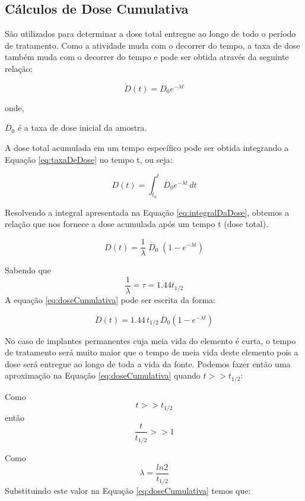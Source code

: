 \documentclass[11pt,a4paper]{article}
\begin{document}
		\subsection{Cálculos de Dose Cumulativa}

			São utilizados para determinar a dose total entregue ao longo de todo o período de tratamento. Como a atividade muda com o decorrer do tempo, a taxa de dose também muda com o decorrer do tempo e pode ser obtida através da seguinte relação:

				\begin{equation}
					\dot{D}(t) = \dot{D_0} e^{-\lambda t}
					\label{eq:taxaDeDose}
				\end{equation}

			onde,

			$\dot{D_0}$ é a taxa de dose inicial da amostra.

			A dose total acumulada em um tempo específico pode ser obtida integrando a Equação \ref{eq:taxaDeDose} no tempo t, ou seja:

				\begin{equation}
					D(t) = \int_{t_0}^{t} \dot{D_0} e^{-\lambda t}\,dt
					\label{eq:integralDaDose}
				\end{equation}

			Resolvendo a integral apresentada na Equação \ref{eq:integralDaDose}, obtemos a relação que nos fornece a dose acumulada após um tempo t (dose total).

				\begin{equation}
					D(t) = \frac{1}{\lambda} \; \dot{D_0} \; (1 - e^{-\lambda t})
					\label{eq:doseCumulativa}
				\end{equation}

			Sabendo que $$\frac{1}{\lambda} = \tau = 1.44 t_{1/2}$$ A equação \ref{eq:doseCumulativa} pode ser escrita da forma:

				\begin{equation}
					D(t) = 1.44\,t_{1/2} \,\dot{D_0} (1 - e^{-\lambda t})
				\end{equation}

			No caso de implantes permanentes cuja meia vida do elemento é curta, o tempo de tratamento será muito maior que o tempo de meia vida deste elemento pois a dose será entregue ao longo de toda a vida da fonte. Podemos fazer então uma aproximação na Equação \ref{eq:doseCumulativa} quando $t >> t_{1/2}$: 

			Como $$t >> t_{1/2}$$ então $$\frac{t}{t_{1/2}} >> 1$$

			Como $$\lambda = \frac{ln 2}{t_{1/2}}$$ Substituindo este valor na Equação \ref{eq:doseCumulativa} temos que: 
\end{document}
